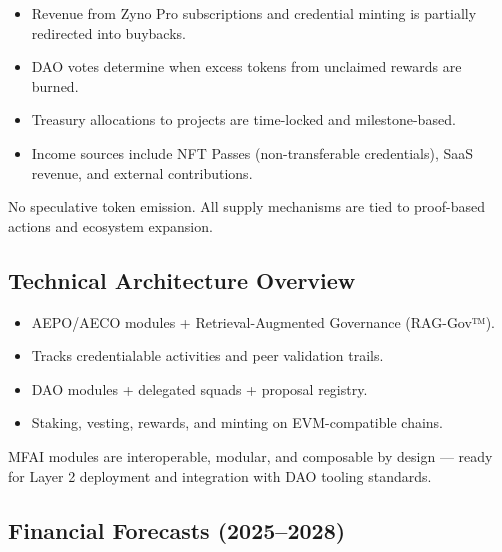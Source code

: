\begin{itemize}
  \item {} Revenue from Zyno Pro subscriptions and credential minting is partially redirected into buybacks.
  \item {} DAO votes determine when excess tokens from unclaimed rewards are burned.
  \item {} Treasury allocations to projects are time-locked and milestone-based.
  \item {} Income sources include NFT Passes (non-transferable credentials), SaaS revenue, and external contributions.
\end{itemize}

\begin{mfai-warning}
No speculative token emission. All supply mechanisms are tied to proof-based actions and ecosystem expansion.
\end{mfai-warning}

\vspace{2em}

\subsection*{Technical Architecture Overview}

\begin{itemize}
  \item {} AEPO/AECO modules + Retrieval-Augmented Governance (RAG-Gov™).
  \item {} Tracks credentialable activities and peer validation trails.
  \item {} DAO modules + delegated squads + proposal registry.
  \item {} Staking, vesting, rewards, and minting on EVM-compatible chains.
\end{itemize}

\vspace{1em}
\begin{mfai-note}
MFAI modules are interoperable, modular, and composable by design — ready for Layer 2 deployment and integration with DAO tooling standards.
\end{mfai-note}

\vspace{2em}

\subsection*{Financial Forecasts (2025–2028)}

